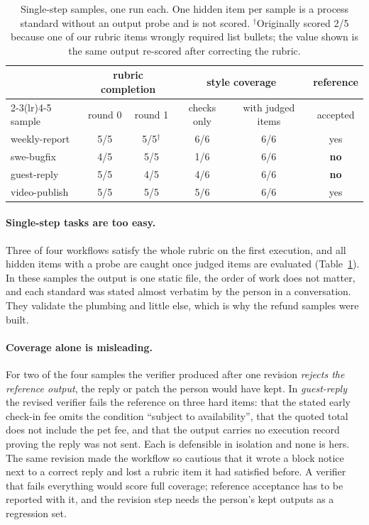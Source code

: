 \documentclass[10pt]{article}
\begin{document}
\begin{table}[h]
\centering\small
\begin{tabular}{@{}lccccc@{}}
\toprule
 & \multicolumn{2}{c}{rubric completion} & \multicolumn{2}{c}{style coverage} & reference \\
\cmidrule(lr){2-3}\cmidrule(lr){4-5}
sample & round 0 & round 1 & checks only & with judged items & accepted \\
\midrule
weekly-report & 5/5 & 5/5$^{\dagger}$ & 6/6 & 6/6 & yes \\
swe-bugfix    & 4/5 & 5/5 & 1/6 & 6/6 & \textbf{no} \\
guest-reply   & 5/5 & 4/5 & 4/6 & 6/6 & \textbf{no} \\
video-publish & 5/5 & 5/5 & 5/6 & 6/6 & yes \\
\bottomrule
\end{tabular}
\caption{Single-step samples, one run each. One hidden item per sample is a process standard without an output
probe and is not scored. $^{\dagger}$Originally scored 2/5 because one of our rubric items wrongly required list
bullets; the value shown is the same output re-scored after correcting the rubric.}
\label{tab:single}
\end{table}

\paragraph{Single-step tasks are too easy.} Three of four workflows satisfy the whole rubric on the first
execution, and all hidden items with a probe are caught once judged items are evaluated
(Table~\ref{tab:single}). In these samples the output is one static file, the order of work does not matter, and
each standard was stated almost verbatim by the person in a conversation. They validate the plumbing and little
else, which is why the refund samples were built.

\paragraph{Coverage alone is misleading.} For two of the four samples the verifier produced after one revision
\emph{rejects the reference output}, the reply or patch the person would have kept. In \emph{guest-reply} the
revised verifier fails the reference on three hard items: that the stated early check-in fee omits the condition
``subject to availability'', that the quoted total does not include the pet fee, and that the output carries no
execution record proving the reply was not sent. Each is defensible in isolation and none is hers. The same
revision made the workflow so cautious that it wrote a block notice next to a correct reply and lost a rubric item
it had satisfied before. A verifier that fails everything would score full coverage; reference acceptance has to
be reported with it, and the revision step needs the person's kept outputs as a regression set.
\end{document}
